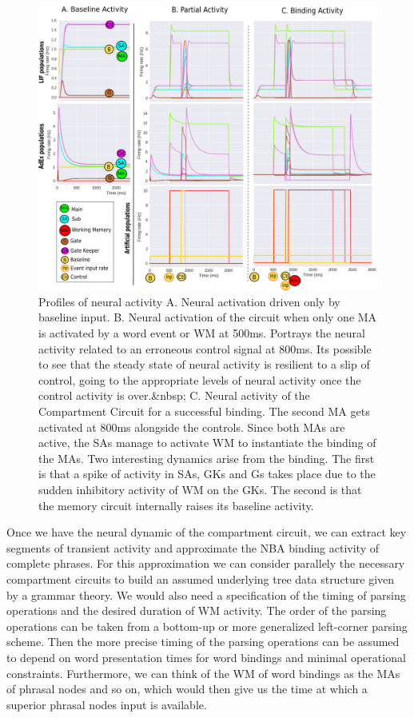 \documentclass[10pt]{article}
\begin{document}
\begin{figure}[h!]
  \begin{center}
    \includegraphics[width=0.70\columnwidth]{figures/compartment_circuit_dynamics/compartment_circuit_dynamics}
    \caption{{\label{activity_profiles} Profiles of neural activity 
        A. Neural activation driven only by baseline input. B. Neural activation of the circuit when only one MA is activated by a word event or WM at 500ms. Portrays the neural activity related to an erroneous control signal at 800ms. Its possible to see that the steady state of neural activity is resilient to a slip of control, going to the appropriate levels of neural activity once the control activity is over.&nbsp; C. Neural activity of the Compartment Circuit for a successful binding. The second MA gets activated at 800ms alongside the controls. Since both MAs are active, the SAs manage to activate WM to instantiate the binding of the MAs. Two interesting dynamics arise from the binding. The first is that a spike of activity in SAs, GKs and Gs takes place due to the sudden inhibitory activity of WM on the GKs. The second is that the memory circuit internally raises its baseline activity.%
      }}
  \end{center}
\end{figure}

Once we have the neural dynamic of the compartment circuit, we can
extract key segments of transient activity and approximate the NBA
binding activity of complete phrases. For this approximation we can
consider parallely the necessary compartment circuits to build an
assumed underlying tree data structure given by a grammar theory. We
would also need a specification of the timing of parsing operations
and the desired duration of WM activity. The order of the parsing
operations can be taken from a bottom-up or more generalized
left-corner parsing scheme. Then the more precise timing of the
parsing operations can be assumed to depend on word presentation times
for word bindings and minimal operational constraints. Furthermore, we
can think of the WM of word bindings as the MAs of phrasal nodes and
so on, which would then give us the time at which a superior phrasal
nodes input is available.
\end{document}
